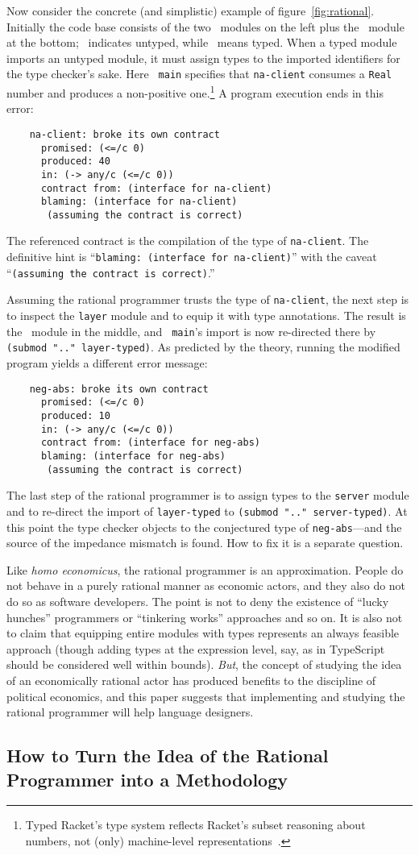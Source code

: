 Now consider the concrete (and simplistic) example of figure~\ref{fig:rational}.
Initially the code base consists of the two \dyncolor\ modules on the left plus
the \typecolor\ module at the bottom; \dyncolor\ indicates untyped, while
\typecolor\ means typed. When a typed module imports an untyped module, it must
assign types to the imported identifiers for the type checker's sake. Here {\tt
main} specifies that {\tt na-client} consumes a {\tt Real} number and produces a
non-positive one.\footnote{Typed Racket's type system reflects Racket's subset
reasoning about numbers, not (only) machine-level
representations~\cite{stathff-padl-12}.} A program execution ends in this error:
\begin{verbatim}
    na-client: broke its own contract
      promised: (<=/c 0)
      produced: 40
      in: (-> any/c (<=/c 0))           
      contract from: (interface for na-client)
      blaming: (interface for na-client)
       (assuming the contract is correct)
\end{verbatim}
The referenced contract is the compilation of the type of {\tt na-client}. The
definitive hint is ``{\tt blaming: (interface for na-client)}'' with the caveat
``{\tt (assuming the contract is correct)}.''

Assuming the rational programmer trusts the type of {\tt na-client}, the next
step is to inspect the {\tt layer} module and to equip it with type
annotations. The result is the \typecolor\ module in the middle, and {\tt
main}'s import is now re-directed there by {\tt (submod ".." layer-typed)}. As
predicted by the theory, running the modified program yields a different error message:
\begin{verbatim}
    neg-abs: broke its own contract
      promised: (<=/c 0)
      produced: 10
      in: (-> any/c (<=/c 0))
      contract from: (interface for neg-abs)
      blaming: (interface for neg-abs)
       (assuming the contract is correct)
\end{verbatim}
The last step of the rational programmer is to assign types to the {\tt server}
module and to re-direct the import of {\tt layer-typed} to {\tt (submod ".."
server-typed)}. At this point the type checker objects to the conjectured type
of {\tt neg-abs}---and the source of the impedance mismatch is found. How to fix
it is a separate question.

Like {\it homo economicus\/}, the rational programmer is an approximation.
People do not behave in a purely rational manner as economic actors, and they
also do not do so as software developers. The point is not to deny the existence
of ``lucky hunches'' programmers or ``tinkering works'' approaches and so on. It
is also not to claim that equipping entire modules with types represents an
always feasible approach (though adding types at the expression level, say, as
in TypeScript should be considered well within bounds).  {\em But\/}, the
concept of studying the idea of an economically rational actor has produced
benefits to the discipline of political economics, and this paper suggests that
implementing and studying the rational programmer will help language designers.

\subsection{How to Turn the Idea of the Rational Programmer into a Methodology} 
\label{sub:methodology}



